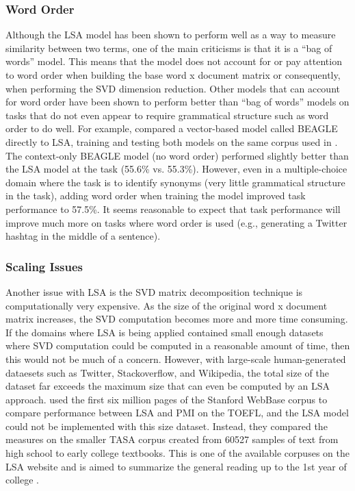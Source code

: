 \documentclass[man,floatsintext]{apa6}
\begin{document}
\subsubsection{Word Order}

Although the LSA model has been shown to perform well as a way to measure similarity between two terms, one of the main criticisms is that it is a ``bag of words'' model.
This means that the model does not account for or pay attention to word order when building the base word x document matrix or consequently, when performing the SVD dimension reduction.
Other models that can account for word order have been shown to perform better than ``bag of words'' models on tasks that do not even appear to require grammatical structure such as word order to do well.
For example, \textcite{Jones2007} compared a vector-based model called BEAGLE directly to LSA, training and testing both models on the same corpus used in \textcite{Landauer1997}.
The context-only BEAGLE model (no word order) performed slightly better than the LSA model at the task (55.6\% vs. 55.3\%).
However, even in a multiple-choice domain where the task is to identify synonyms (very little grammatical structure in the task), adding word order when training the model improved task performance to 57.5\%.
It seems reasonable to expect that task performance will improve much more on tasks where word order is used (e.g., generating a Twitter hashtag in the middle of a sentence).

\subsubsection{Scaling Issues}

Another issue with LSA is the SVD matrix decomposition technique is computationally very expensive.
As the size of the original word x document matrix increases, the SVD computation becomes more and more time consuming.
If the domains where LSA is being applied contained small enough datasets where SVD computation could be computed in a reasonable amount of time, then this would not be much of a concern.
However, with large-scale human-generated dataesets such as Twitter, Stackoverflow, and Wikipedia, the total size of the dataset far exceeds the maximum size that can even be computed by an LSA approach.
\textcite{Budiu2007} used the first six million pages of the Stanford WebBase corpus to compare performance between LSA and PMI on the TOEFL, and the LSA model could not be implemented with this size dataset.
Instead, they compared the measures on the smaller TASA corpus created from \num{60527} samples of text from high school to early college textbooks.
This is one of the available corpuses on the LSA website and is aimed to summarize the general reading up to the 1st year of college \parencite{Budiu2007}.
\end{document}
